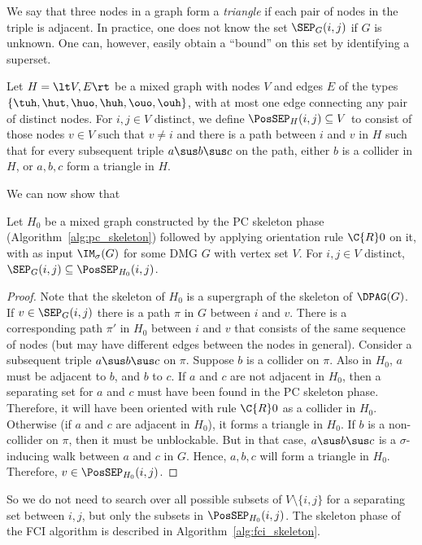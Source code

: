 We say that three nodes in a graph form a \emph{triangle} if each pair of nodes in the triple is adjacent.
In practice, one does not know the set $\SEP_G(i,j)$ if $G$ is unknown.
One can, however, easily obtain a ``bound'' on this set by identifying a superset.
\begin{Def}
  Let $H = \lt V,E\rt$ be a mixed graph with nodes $V$ and edges $E$ of the types $\{\tuh,\hut,\huo,\huh,\ouo,\ouh\}$, with at most one edge connecting any pair of distinct nodes.
  For $i, j \in V$ distinct, we define $\PosSEP_H(i,j) \subseteq V$ to consist of those nodes
  $v \in V$ such that $v \ne i$ and there is a path between $i$ and $v$ in $H$ such that for
  every subsequent triple $a \sus b \sus c$ on the path, either $b$ is a collider in $H$,
  or $a,b,c$ form a triangle in $H$.
\end{Def}
We can now show that
\begin{Prp}
  Let $H_0$ be a mixed graph constructed by the PC skeleton phase (Algorithm~\ref{alg:pc_skeleton}) followed by applying orientation rule $\C{R}0$ on it, with as input $\IM_\sigma(G)$ for some DMG $G$ with vertex set $V$.
  For $i, j \in V$ distinct, $\SEP_G(i,j) \subseteq \PosSEP_{H_0}(i,j)$.
\end{Prp}
\begin{proof}
  Note that the skeleton of $H_0$ is a supergraph of the skeleton of $\DPAG(G)$.
  If $v \in \SEP_G(i,j)$ there is a path $\pi$ in $G$ between $i$ and $v$.
  There is a corresponding path $\pi'$ in $H_0$ between $i$ and $v$ that consists of the same sequence of nodes (but may have different edges between the nodes in general).
  Consider a subsequent triple $a \sus b \sus c$ on $\pi$.
  Suppose $b$ is a collider on $\pi$.
  Also in $H_0$, $a$ must be adjacent to $b$, and $b$ to $c$.
  If $a$ and $c$ are not adjacent in $H_0$, then a separating set for $a$ and $c$ must have been found in the PC skeleton phase.
  Therefore, it will have been oriented with rule $\C{R}0$ as a collider in $H_0$.
  Otherwise (if $a$ and $c$ are adjacent in $H_0$), it forms a triangle in $H_0$.
  If $b$ is a non-collider on $\pi$, then it must be unblockable.
  But in that case, $a \sus b \sus c$ is a $\sigma$-inducing walk between $a$ and $c$ in $G$.
  Hence, $a,b,c$ will form a triangle in $H_0$.
  Therefore, $v \in \PosSEP_{H_0}(i,j)$.
\end{proof}
So we do not need to search over all possible subsets of $V \setminus \{i,j\}$ for a separating set between $i,j$, but only the subsets in $\PosSEP_{H_0}(i,j)$.
The skeleton phase of the FCI algorithm is described in Algorithm~\ref{alg:fci_skeleton}. 
